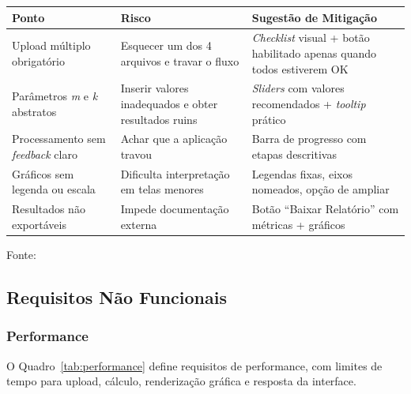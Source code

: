 \begin{quadro}[ht]
\begin{center}
\small
\captionsetup{justification=centering, labelsep=endash, width=0.75\linewidth}
\caption{Pontos críticos de usabilidade e estratégias de mitigação.}
\label{tab:pontos-criticos}
\begin{threeparttable}
\begin{tabularx}{\textwidth}{|l|X|X|} \hline
\textbf{Ponto} & \textbf{Risco} & \textbf{Sugestão de Mitigação} \\ \hline
Upload múltiplo obrigatório & Esquecer um dos 4 arquivos e travar o fluxo & \textit{Checklist} visual + botão habilitado apenas quando todos estiverem OK \\ \hline
Parâmetros \textit{m} e \textit{k} abstratos & Inserir valores inadequados e obter resultados ruins & \textit{Sliders} com valores recomendados + \textit{tooltip} prático \\ \hline
Processamento sem \textit{feedback} claro & Achar que a aplicação travou & Barra de progresso com etapas descritivas \\ \hline
Gráficos sem legenda ou escala & Dificulta interpretação em telas menores & Legendas fixas, eixos nomeados, opção de ampliar \\ \hline
Resultados não exportáveis & Impede documentação externa & Botão ``Baixar Relatório'' com métricas + gráficos \\ \hline
\end{tabularx}
\begin{tablenotes}[flushleft]
\footnotesize
\item Fonte:~\oautor
\end{tablenotes}
\end{threeparttable}
\end{center}
\end{quadro}



\subsection{Requisitos Não Funcionais}
\label{subsec:nao-funcionais}

\subsubsection{Performance}
\label{ssubsec:performance}
O Quadro~\ref{tab:performance} define requisitos de performance, com limites de tempo para upload, cálculo, renderização gráfica e resposta da interface.

